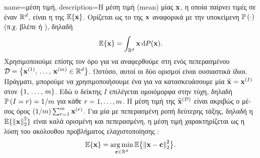 {name={\foreignlanguage{greek}{μέση τιμή}},
	description={\foreignlanguage{greek}{Η μέση τιμή} (mean) \foreignlanguage{greek}{μίας} 
		 ${\bf x}$, \foreignlanguage{greek}{η οποία παίρνει τιμές σε έναν}  
		$\mathbb{R}^{d}$, \foreignlanguage{greek}{είναι η}  \foreignlanguage{greek}{της}
 		$\mathbb{E}\{{\bf x}\}$. \foreignlanguage{greek}{Ορίζεται ως το}  \foreignlanguage{greek}{της 
		${\bf x}$ αναφορικά με την υποκείμενη}  $\mathbb{P}\left(\cdot\right)$ (\foreignlanguage{greek}{π.χ. βλέπε} 
		\cite{RudinBookPrinciplesMatheAnalysis} \foreignlanguage{greek}{ή} \cite{BillingsleyProbMeasure}), \foreignlanguage{greek}{δηλαδή}
		\[
			\mathbb{E}\{{\bf x}\} = \int_{\mathbb{R}^{d}} {\bf x} \, \mathrm{d}P({\bf x}).
		\]  
		\foreignlanguage{greek}{Χρησιμοποιούμε επίσης τον όρο για να αναφερθούμε στη}  
		\foreignlanguage{greek}{ενός πεπερασμένου}   
		$\mathcal{D} = \left\{ {\bf x}^{(1)}, \,\ldots, \,{\bf x}^{(m)} \in \mathbb{R}^{d}\right\}$. \foreignlanguage{greek}{Ωστόσο, 
		αυτοί οι δύο ορισμοί είναι ουσιαστικά ίδιοι. Πράγματι, μπορούμε να χρησιμοποιήσουμε ένα}   
		\foreignlanguage{greek}{για να κατασκευάσουμε μία}  $\widetilde{{\bf x}}={\bf x}^{(I)}$ \foreignlanguage{greek}{στον} 
		 $\{1, \,\ldots, \,m\}$. \foreignlanguage{greek}{Εδώ ο δείκτης $I$ επιλέγεται ομοιόμορφα στην τύχη,
		δηλαδή $\mathbb{P}\left(I=r\right)=1/m$ για κάθε $r=1,\ldots,m$. Η μέση τιμή της 
		$\widetilde{{\bf x}}^{(\mathcal{D})}$ είναι ακριβώς ο μέσος όρος} $({1}/{m}) \sum_{r=1}^{m} {\bf x}^{(r)}$.
		\foreignlanguage{greek}{Για μία}  \foreignlanguage{greek}{με πεπερασμένη ροπή δεύτερης τάξης, δηλαδή η
		$\expect\{ \normgeneric{\featurevec}{2}^{2} \}$ είναι καλά ορισμένη και πεπερασμένη, η μέση τιμή χαρακτηρίζεται ως η λύση του
		ακόλουθου προβλήματος ελαχιστοποίησης}  \cite{BertsekasProb}:
		\[
			\expect\{\featurevec\} = \argmin_{\vc \in \mathbb{R}^{\nrfeatures}} 
			\expect \big\{\normgeneric{\featurevec - \vc}{2}^{2}\big \}.
		\]
}}
